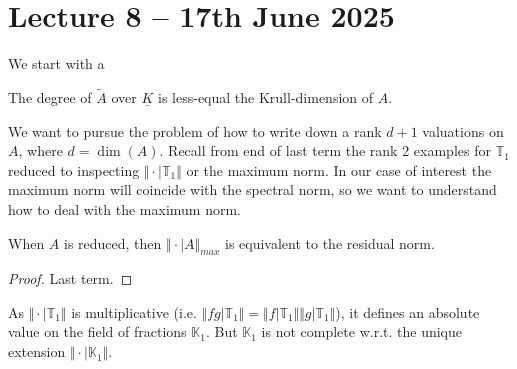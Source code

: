\section{Lecture 8 -- 17th June 2025}\label{sec: lecture 5}
We start with a 
\begin{remark}
The degree of $\tilde{A}$ over $\underline{K}$ is less-equal the Krull-dimension
of $A$.
\end{remark}
We want to pursue the problem of how to write down a rank $d+1$ valuations
on $A$, where $d=\dim(A)$. Recall from end of last term the rank 2 examples
for $\mathbb{T}_1$ reduced to inspecting $\Vert\cdot|\mathbb{T}_1\Vert$ 
or the maximum norm. In our case of interest the maximum norm will
coincide with the spectral norm, so we want to understand how to
deal with the maximum norm.
\begin{proposition}
When $A$ is reduced, then $\Vert\cdot|A\Vert_{max}$ is equivalent to the
residual norm.
\end{proposition}
\begin{proof}
Last term.
\end{proof}
As $\Vert\cdot|\mathbb{T}_1\Vert$ is multiplicative (i.e. 
$\Vert fg|\mathbb{T}_1\Vert=\Vert f|\mathbb{T}_1\Vert\Vert g|\mathbb{T}_1\Vert$),
it defines an absolute value on the field of fractions $\mathbb{K}_1$.
But $\mathbb{K}_1$ is not complete w.r.t. the unique extension
$\Vert\cdot|\mathbb{K}_1\Vert$.

